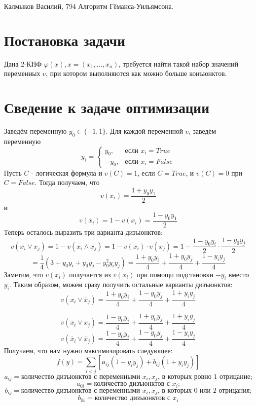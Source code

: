 \documentclass[12pt]{article}
\begin{document}
Калмыков Василий, 794 \newline
Алгоритм Гёманса-Уильямсона.
\section{Постановка задачи}
Дана 2-КНФ $\varphi(x), x = (x_1, \dots, x_n)$, требуется найти такой набор значений переменных $v$, при котором выполняются как можно больше конъюнктов.
\section{Сведение к задаче оптимизации}
Заведём переменную $y_0 \in \{-1, 1\}$. Для каждой переменной $v_i$ заведём переменную $$
y_i = \left\{
\begin{array}{cc}
    y_0, & \text{если } x_i = True \\
    -y_0, & \text{если } x_i = False
\end{array}\right.
$$
Пусть $C$ - логическая формула и $v(C) = 1$, если $C = True$, и $v(C) = 0$ при $C = False$.
Тогда получаем, что
$$
v(x_i) = \frac{1 + y_0 y_1}{2}
$$
и
$$
v(\overline{x}_i) = 1 - v(x_i) = \frac{1 - y_0 y_1}{2}
$$
Теперь осталось выразить три варианта дизъюнктов:
$$
v(x_i \vee x_j) = 1 - v(x_i \wedge x_j) =
1 - v(x_i) \cdot v(x_j) = 
1 - \frac{1 - y_0 y_i}{2} \cdot \frac{1 - y_0 y_j}{2}
$$$$
= \frac{1}{4} \left(3 + y_0 y_i + y_0 y_j - y_0^2 y_i y_j \right)
= \frac{1 + y_0 y_i}{4} + \frac{1 + y_0 y_j}{4} + \frac{1 - y_i y_j}{4}
$$
Заметим, что $v(\overline{x}_i)$ получается из $v(x_i)$ при помощи подстановки $-y_i$ вместо $y_i$. Таким образом, можем сразу получить остальные варианты дизъюнктов:
$$
v(x_i \vee \overline{x}_j) = \frac{1 + y_0 y_i}{4} + \frac{1 - y_0 y_j}{4} + \frac{1 + y_i y_j}{4}
$$

$$
v(\overline{x}_i \vee x_j) =  \frac{1 - y_0 y_i}{4} + \frac{1 + y_0 y_j}{4} + \frac{1 + y_i y_j} {4}
$$
$$
v(\overline{x}_i \vee \overline{x}_j) =
\frac{1 - y_0 y_i}{4} + \frac{1 - y_0 y_j}{4} + \frac{1 - y_i y_j}{4}
$$
Получаем, что нам нужно максимизировать следующее:
$$
f(y) = \sum_{i < j} \left[ a_{ij} (1 - y_i y_j) + b_{ij}(1 + y_i y_j)\right]
$$
$$
a_{ij} = \text{количество дизъюнктов с переменными } x_i, x_j \text{, в которых ровно 1 отрицание;} 
$$$$
a_{0i} = \text{количество дизъюнктов с } \overline{x}_i \text{;}
$$
$$
b_{ij} = \text{количество дизъюнктов с переменными } x_i, x_j \text{, в которых 0 или 2 отрицания;}
$$
$$
b_{0i} = \text{количество дизъюнктов с } x_i
$$
\end{document}
